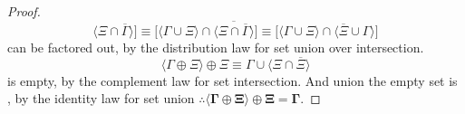 \documentclass[preview]{standalone}
\begin{document}
\begin{proof}
\begin{equation*}
            \Big \langle 
                \Xi
                    \cap 
                \overline{\Gamma} 
            \Big \rangle
        \bigg]
            \equiv
        \bigg[
            \Big \langle \Gamma \cup \Xi \Big \rangle
                \cap
            \Big \langle \overline{
                \Xi
                    \cap 
                \overline{\Gamma} 
            } \Big \rangle
        \bigg]
            \equiv
        \bigg[
            \Big \langle \Gamma \cup \Xi \Big \rangle
                \cap
            \Big \langle 
                \overline{\Xi}
                    \cup 
                \Gamma
            \Big \rangle
        \bigg]
    \end{equation*}
    \bm{$\Gamma$} can be factored out,
    by the distribution law for set union over intersection.
    \begin{equation*}
        \Big \langle \Gamma \oplus \Xi \Big \rangle
            \oplus 
        \Xi
            \equiv
        \Gamma 
            \cup
        \Big \langle \Xi \cap \overline{\Xi} \Big \rangle
    \end{equation*}
    \bm{$\Xi \cap \overline{\Xi}$} is empty, 
    by the complement law for set intersection. 
    And \bm{$\Gamma$} union the empty set is \bm{$\Gamma$},
    by the identity law for set union $\therefore \bm{
    \big \langle \Gamma \oplus \Xi \big \rangle
        \oplus 
    \Xi 
        = 
    \Gamma}$.
\end{proof}
\end{document}
